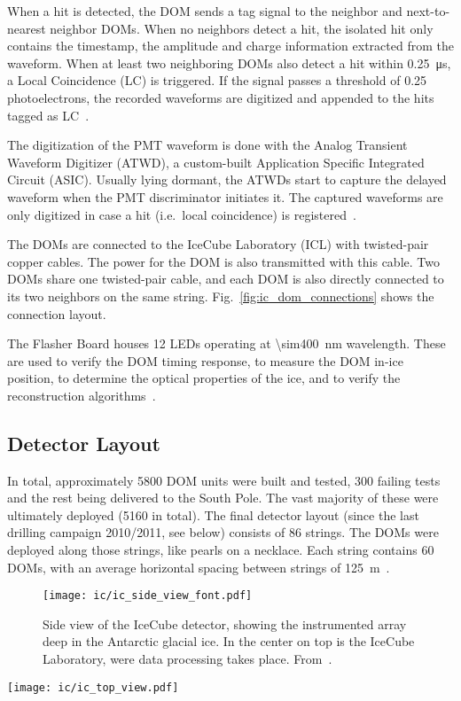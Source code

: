 When a hit is detected, the DOM sends a tag signal to the neighbor and next-to-nearest neighbor DOMs. When no neighbors detect a hit, the isolated hit only contains the timestamp, the amplitude and charge information extracted from the waveform. When at least two neighboring DOMs also detect a hit within \SI{0.25}{\micro\s}, a Local Coincidence (LC) is triggered. If the signal passes a threshold of 0.25 photoelectrons, the recorded waveforms are digitized and appended to the hits tagged as LC~\cite{Aartsen2017}.

The digitization of the PMT waveform is done with the Analog Transient Waveform Digitizer (ATWD), a custom-built Application Specific Integrated Circuit (ASIC). Usually lying dormant, the ATWDs start to capture the delayed waveform when the PMT discriminator initiates it. The captured waveforms are only digitized in case a hit (i.e.\ local coincidence) is registered~\cite{Aartsen2017}.

The DOMs are connected to the IceCube Laboratory (ICL) with twisted-pair copper cables. The power for the DOM is also transmitted with this cable. Two DOMs share one twisted-pair cable, and each DOM is also directly connected to its two neighbors on the same string. Fig.~\ref{fig:ic_dom_connections} shows the connection layout.

The Flasher Board houses 12 LEDs operating at \SI{\sim400}{\nm} wavelength. These are used to verify the DOM timing response, to measure the DOM in-ice position, to determine the optical properties of the ice, and to verify the reconstruction algorithms~\cite{Aartsen2017}.

\subsection{Detector Layout}
In total, approximately 5800 DOM units were built and tested, 300 failing tests and the rest being delivered to the South Pole. The vast majority of these were ultimately deployed (5160 in total). The final detector layout (since the last drilling campaign 2010/2011, see below) consists of 86 strings. The DOMs were deployed along those strings, like pearls on a necklace. Each string contains 60 DOMs, with an average horizontal spacing between strings of \SI{125}{\meter}~\cite{Aartsen2017}.

\begin{figure}
    \texttt{[image: ic/ic\_side\_view\_font.pdf]}
    \caption[IceCube side-on]{Side view of the IceCube detector, showing the instrumented array deep in the Antarctic glacial ice. In the center on top is the IceCube Laboratory, were data processing takes place. From~\cite{Ahlers2018a}.}
\end{figure}
\begin{marginfigure}
    \texttt{[image: ic/ic\_top\_view.pdf]}
    \caption[IceCube top-down view]{Top-down view of the IceCube detector, spanning \SI{1}{\square\km} on the surface. From~\cite{Ahlers2018a}.}
\end{marginfigure}

